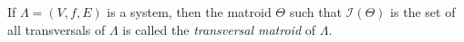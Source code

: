 If $\Lambda = (V, f, E)$ is a system, then the matroid $\Theta$ such that $\mathcal{I}(\Theta)$ is the set of all transversals of $\Lambda$ is called the \textit{transversal matroid} of $\Lambda$.
